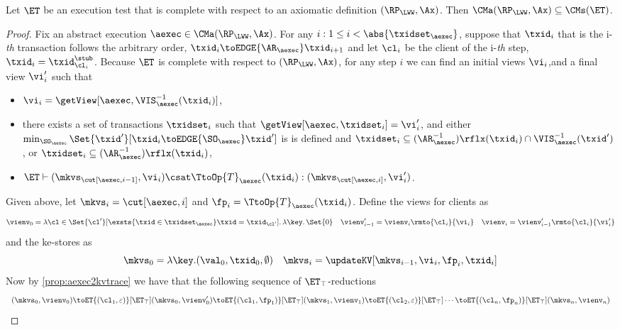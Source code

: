 \begin{theorem}
\label{thm:et_complete}
Let $\ET$ be an execution test that is complete with respect to an axiomatic definition $(\RP_{\LWW}, \Ax)$. 
Then $\CMa(\RP_{\LWW}, \Ax) \subseteq \CMs(\ET)$.
\end{theorem}
\begin{proof}
Fix an abstract execution $\aexec \in \CMa(\RP_{\LWW}, \Ax)$. 
For any \(i : 1 \leq i < \abs{\txidset_\aexec} \), suppose that \( \txid_i \) that is the i-\emph{th} transaction follows the arbitrary order, \ie $\txid_{i} \toEDGE{\AR_{\aexec}} \txid_{i+1}$ 
and let $\cl_{i}$ be the client of the i-\emph{th} step, \ie $\txid_{i} = \txid_{\cl_{i}}^{\stub}$.
Because $\ET$ is complete with respect to $(\RP_{\LWW}, \Ax)$, 
for any step $i$ we can find an initial views $\vi_i$,and a final view $\vi'_{i}$ such that 
\begin{itemize}
\item $\vi_i = \getView[\aexec, \VIS^{-1}_{\aexec}(\txid_{i})]$, 
\item there exists a set of transactions $\txidset_{i}$ such that $\getView[\aexec, \txidset_{i}] = \vi'_{i}$, and 
either $\min_{\SO_{\aexec}}\Set{\txid' }[ \txid_{i} \toEDGE{\SO_{\aexec}} \txid']$ is 
is defined and $\txidset_{i} \subseteq (\AR_{\aexec}^{-1})\rflx(\txid_{i}) \cap \VIS^{-1}_{\aexec}(\txid')$, 
or $\txidset_{i} \subseteq (\AR_{\aexec}^{-1})\rflx(\txid_{i})$, 
\item $\ET \vdash (\mkvs_{\cut[\aexec, i-1]}, \vi_i) \csat \TtoOp{T}_{\aexec}(\txid_{i}): (\mkvs_{\cut[\aexec, i]}, \vi'_{i})$.
\end{itemize}
Given above, let $\mkvs_{i} = \cut[\aexec, i]$ and $\fp_{i} = \TtoOp{T}_{\aexec}(\txid_{i})$. Define the views for clients as 
\[
\vienv_{0} = \lambda \cl \in \Set{\cl' }[ \exsts{ \txid \in \txidset_{\aexec} } \txid = \txid_{\cl'}] \ldotp \lambda \key \ldotp \Set{0}
\quad \vienv'_{i-1} = \vienv_{i}\rmto{\cl_{i}}{ \vi_i}
\quad \vienv_{i} = \vienv'_{i-1}\rmto{\cl_{i} }{\vi'_{i}}
\]
and the ke-stores as
\[
\mkvs_{0} = \lambda \key.(\val_{0}, \txid_{0}, \emptyset)
\quad \mkvs_{i} = \updateKV[\mkvs_{i-1}, \vi_i, \fp_{i}, \txid_{i}]
\]
Now by \cref{prop:aexec2kvtrace} we have that the following sequence of $\ET_{\top}$-reductions 
\[
\begin{array}{l}
(\mkvs_{0}, \vienv_{0}) \toET{(\cl_{1}, \varepsilon)}[\ET_{\top}] (\mkvs_{0}, \vienv'_{0}) 
\toET{(\cl_{1}, \fp_{1})}[\ET_{\top}] (\mkvs_{1}, \vienv_{1}) 
\toET{(\cl_{2}, \varepsilon)}[\ET_{\top}]
\cdots \toET{(\cl_{n}, \fp_{n})}[\ET_{\top}] (\mkvs_{n}, \vienv_{n})

\end{array}\]
\end{proof}

